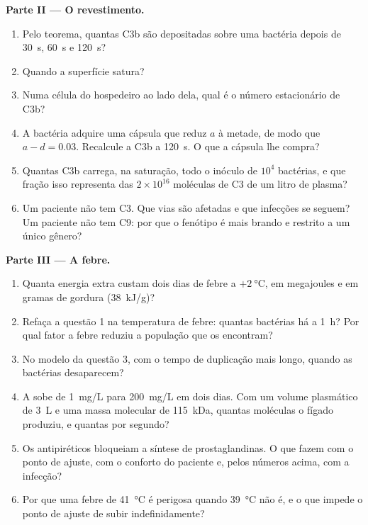 \begin{problem}
\medskip
\noindent\textbf{Parte II --- O revestimento.}
\begin{enumerate}[resume]
  \item Pelo teorema, quantas C3b são depositadas sobre uma bactéria
        depois de \qty{30}{s}, \qty{60}{s} e \qty{120}{s}?
  \item Quando a superfície satura?
  \item Numa célula do hospedeiro ao lado dela, qual é o número
        estacionário de C3b?
  \item A bactéria adquire uma cápsula que reduz $a$ à metade, de modo
        que $a -
        d = 0.03$. Recalcule a C3b a \qty{120}{s}. O que a
        cápsula lhe compra?
  \item Quantas C3b carrega, na saturação, todo o inóculo de $10^{4}$
        bactérias, e que fração isso representa das $2\times 10^{16}$
        moléculas de C3 de um litro de plasma?
  \item Um paciente não tem C3. Que vias são afetadas e que infecções
        se seguem? Um paciente não tem C9: por que o fenótipo é mais
        brando e restrito a um único gênero?
\end{enumerate}

\medskip
\noindent\textbf{Parte III --- A febre.}
\begin{enumerate}[resume]
  \item Quanta energia extra custam dois dias de febre a
        $+\qty{2}{\celsius}$, em megajoules e em gramas de gordura
        (\qty{38}{kJ/g})?
  \item Refaça a questão 1 na temperatura de febre: quantas bactérias
        há a \qty{1}{h}? Por qual fator a febre reduziu a população que
        os  encontram?
  \item No modelo da questão 3, com o tempo de duplicação mais longo,
        quando as bactérias desaparecem?
  \item A  sobe de \qty{1}{mg/L} para \qty{200}{mg/L}
        em dois dias. Com um volume plasmático de \qty{3}{L} e uma massa
        molecular de \qty{115}{kDa}, quantas moléculas o fígado
        produziu, e quantas por segundo?
  \item Os antipiréticos bloqueiam a síntese de prostaglandinas. O que
        fazem com o ponto de ajuste, com o conforto do paciente e, pelos
        números acima, com a infecção?
  \item Por que uma febre de \qty{41}{\celsius} é perigosa quando
        \qty{39}{\celsius} não é, e o que impede o ponto de ajuste de
        subir indefinidamente?
\end{enumerate}


\end{problem}
